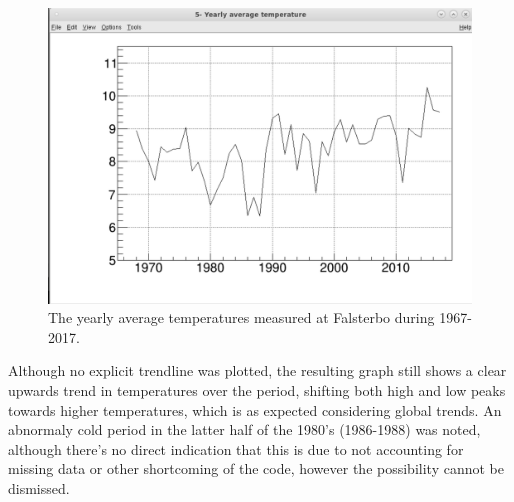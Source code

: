 \begin{figure}[h]
    \centering
    \includegraphics[scale=0.55]{Graph5c.PNG}
    \caption{The yearly average temperatures measured at Falsterbo during 1967-2017.}
    \label{dipole}
\end{figure}

Although no explicit trendline was plotted, the resulting graph still shows a clear upwards trend in temperatures over the period, shifting both high and low peaks towards higher temperatures, which is as expected considering global trends. An abnormaly cold period in the latter half of the 1980's (1986-1988) was noted, although there's no direct indication that this is due to not accounting for missing data or other shortcoming of the code, however the possibility cannot be dismissed.

